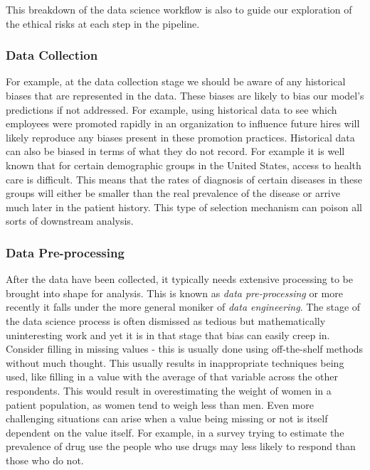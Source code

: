 \documentclass[
]{book}
\theoremstyle{definition}
\theoremstyle{definition}
\theoremstyle{definition}
\theoremstyle{definition}
\theoremstyle{remark}
\begin{document}
This breakdown of the data science workflow is also to guide our exploration of the ethical risks at each step in the pipeline.

\hypertarget{data-collection}{%
\subsubsection{Data Collection}\label{data-collection}}

For example, at the data collection stage we should be aware of any historical biases that are represented in the data. These biases are likely to bias our model's predictions if not addressed. For example, using historical data to see which employees were promoted rapidly in an organization to influence future hires will likely reproduce any biases present in these promotion practices. Historical data can also be biased in terms of what they do not record. For example it is well known that for certain demographic groups in the United States, access to health care is difficult. This means that the rates of diagnosis of certain diseases in these groups will either be smaller than the real prevalence of the disease or arrive much later in the patient history. This type of selection mechanism can poison all sorts of downstream analysis.

\hypertarget{data-pre-processing}{%
\subsubsection{Data Pre-processing}\label{data-pre-processing}}

After the data have been collected, it typically needs extensive processing to be brought into shape for analysis. This is known as \emph{data pre-processing} or more recently it falls under the more general moniker of \emph{data engineering}. The stage of the data science process is often dismissed as tedious but mathematically uninteresting work and yet it is in that stage that bias can easily creep in. Consider filling in missing values - this is usually done using off-the-shelf methods without much thought. This usually results in inappropriate techniques being used, like filling in a value with the average of that variable across the other respondents. This would result in overestimating the weight of women in a patient population, as women tend to weigh less than men. Even more challenging situations can arise when a value being missing or not is itself dependent on the value itself. For example, in a survey trying to estimate the prevalence of drug use the people who use drugs may less likely to respond than those who do not.
\end{document}
